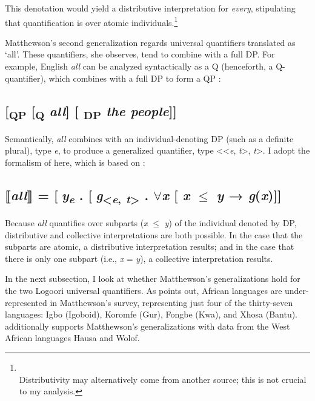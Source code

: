 \documentclass[output=paper]{langsci/langscibook}
\begin{document}
This denotation would yield a distributive interpretation for \textit{every}, stipulating that quantification is over atomic individuals.\footnote{\\
 Distributivity may alternatively come from another source; this is not crucial to my analysis.}

  Matthewson's second generalization regards universal quantifiers translated as ‘all’. These quantifiers, she observes, tend to combine with a full DP. For example, English \textit{all} can be analyzed syntactically as a Q (henceforth, a Q-quantifier), which combines with a full DP to form a QP \citep{Matthewson2001}:  

\subsection{      [\textsubscript{QP} [\textsubscript{Q} \textit{all}] [\textsubscript{ DP} \textit{the people}]]}

Semantically, \textit{all} combines with an individual-denoting DP (such as a definite plural), type \textit{e}, to produce a generalized quantifier, type <<\textit{e},\textit{ t}>, \textit{t}>. I adopt the formalism of \citet{Zimmermann2014} here, which is based on \citet{Matthewson2001}:

\subsection{⟦\textit{all}⟧ = [\textit{y}\textit{\textsubscript{e}} . [\textit{g}\textsubscript{<}\textit{\textsubscript{e}}\textsubscript{,} \textit{\textsubscript{t}}\textsubscript{>} . ${\forall}$\textit{x} [ \textit{x} ${\leq}$\textit{ y} → \textit{g}(\textit{x})]]}

Because \textit{all} quantifies over subparts (\textit{x} ${\leq}$ \textit{y}) of the individual denoted by DP, distributive and collective interpretations are both possible. In the case that the subparts are atomic, a distributive interpretation results; and in the case that there is only one subpart (i.e., \textit{x} = \textit{y}), a collective interpretation results.

  In the next subsection, I look at whether Matthewson's generalizations hold for the two Logoori universal quantifiers. As \citet{Zimmermann2014} points out, African languages are under-represented in Matthewson's survey, representing just four of the thirty-seven languages: Igbo (Igoboid), Koromfe (Gur), Fongbe (Kwa), and Xhosa (Bantu). \citet{Zimmermann2014} additionally supports Matthewson's generalizations with data from the West African languages Hausa \citep{Zimmermann2013} and Wolof.
\end{document}

